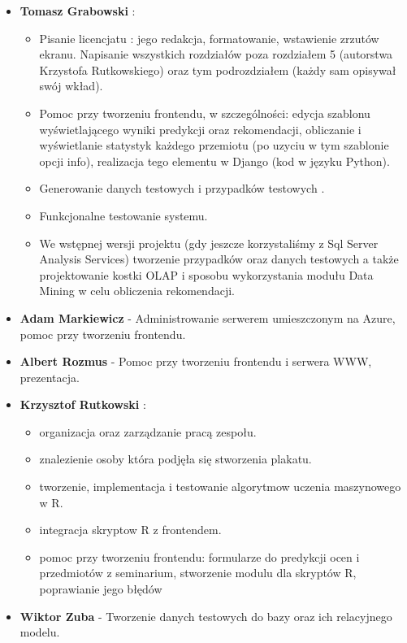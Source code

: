 \documentclass[licencjacka]{pracamgr}
\begin{document}
\begin{itemize}
\item \textbf{Tomasz Grabowski} :
    \begin{itemize} 
    \item Pisanie licencjatu : jego redakcja, formatowanie, wstawienie zrzutów ekranu. Napisanie wszystkich rozdziałów poza rozdziałem 5 (autorstwa Krzystofa Rutkowskiego) oraz tym podrozdziałem (każdy sam opisywał swój wkład).
    \item Pomoc przy tworzeniu frontendu, w szczególności: edycja szablonu wyświetlającego wyniki predykcji oraz rekomendacji, obliczanie i wyświetlanie statystyk każdego przemiotu (po uzyciu w tym szablonie opcji info), realizacja tego elementu w Django (kod w języku Python). 
    \item Generowanie danych testowych i przypadków testowych .
    \item Funkcjonalne testowanie systemu. 
    \item We wstępnej wersji projektu (gdy jeszcze korzystaliśmy z Sql Server Analysis Services) tworzenie przypadków oraz danych testowych a także projektowanie kostki OLAP i sposobu wykorzystania modułu Data Mining w celu obliczenia rekomendacji.
    \end{itemize}

\item \textbf{Adam Markiewicz} - Administrowanie serwerem umieszczonym na Azure, pomoc przy tworzeniu frontendu.
\item \textbf{Albert Rozmus} - Pomoc przy tworzeniu frontendu i serwera WWW, prezentacja.
\item \textbf{Krzysztof Rutkowski} :
    \begin{itemize}
        \item organizacja oraz zarządzanie pracą zespołu.
        \item znalezienie osoby która podjęła się stworzenia plakatu.
        \item tworzenie, implementacja i testowanie algorytmow uczenia maszynowego w R.
        \item integracja skryptow R z frontendem.
        \item pomoc przy tworzeniu frontendu: formularze do predykcji ocen i przedmiotów z seminarium, stworzenie modulu dla skryptów R, poprawianie jego błędów
    \end{itemize}
\item \textbf{Wiktor Zuba} - Tworzenie danych testowych do bazy oraz ich relacyjnego modelu. 
\end{itemize}
\end{document}
